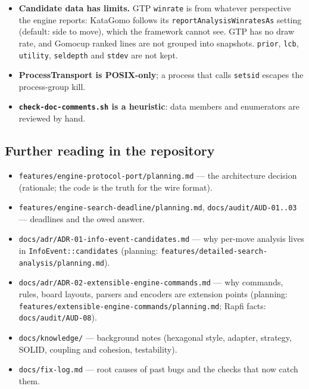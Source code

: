 \documentclass[11pt,a4paper]{article}
\newcommand{\code}[1]{\texttt{#1}}
\newcommand{\file}[1]{\texttt{#1}}
\begin{document}
\begin{itemize}
        Gomocup parser knows; they arrive as \code{MessageEvent}, with no structured fields.
  \item \textbf{Candidate data has limits.} GTP \code{winrate} is from whatever perspective the
        engine reports: KataGomo follows its \code{reportAnalysisWinratesAs} setting (default:
        side to move), which the framework cannot see. GTP has no draw rate, and Gomocup ranked
        lines are not grouped into snapshots. \code{prior}, \code{lcb}, \code{utility},
        \code{seldepth} and \code{stdev} are not kept.
  \item \textbf{ProcessTransport is POSIX-only}; a process that calls \code{setsid} escapes the
        process-group kill.
  \item \textbf{\code{check-doc-comments.sh} is a heuristic}: data members and enumerators are
        reviewed by hand.
\end{itemize}

\subsection*{Further reading in the repository}

\begin{itemize}
  \item \file{features/engine-protocol-port/planning.md} --- the architecture decision (rationale;
        the code is the truth for the wire format).
  \item \file{features/engine-search-deadline/planning.md}, \file{docs/audit/AUD-01..03} ---
        deadlines and the owed answer.
  \item \file{docs/adr/ADR-01-info-event-candidates.md} --- why per-move analysis lives in
        \code{InfoEvent::candidates} (planning:
        \file{features/detailed-search-analysis/planning.md}).
  \item \file{docs/adr/ADR-02-\allowbreak extensible-engine-commands.md} --- why commands, rules, board
        layouts, parsers and encoders are extension points (planning:
        \file{features/\allowbreak extensible-\allowbreak engine-\allowbreak commands/\allowbreak planning.md}; Rapfi facts:
        \file{docs/audit/AUD-08}).
  \item \file{docs/knowledge/} --- background notes (hexagonal style, adapter, strategy, SOLID,
        coupling and cohesion, testability).
  \item \file{docs/fix-log.md} --- root causes of past bugs and the checks that now catch them.
\end{itemize}
\end{document}
